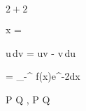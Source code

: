 $2+2$

\displaystyle x = \ 

\int u\,dv = uv - \int v\,du

 = \int_{-\infty}^{\infty} f(x)e^{-2}dx

P \rightarrow Q , P \vdash Q

